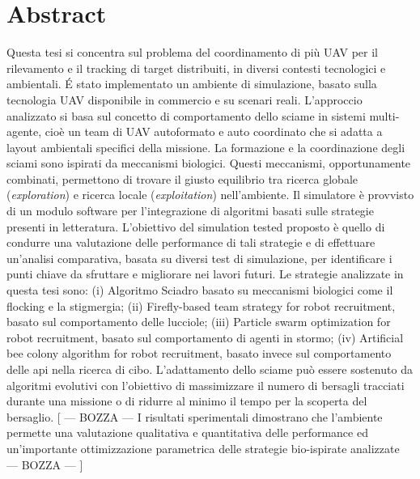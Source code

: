 \chapter*{Abstract}

Questa tesi si concentra sul problema del coordinamento di più UAV per il rilevamento e il tracking di target distribuiti, in diversi contesti tecnologici e ambientali. 
\'E stato implementato un ambiente di simulazione, basato sulla tecnologia UAV disponibile in commercio e su scenari reali. 
L'approccio analizzato si basa sul concetto di comportamento dello sciame in sistemi multi-agente, cioè un team di UAV autoformato e auto coordinato che si adatta a layout ambientali specifici della missione. 
La formazione e la coordinazione degli sciami sono ispirati da meccanismi biologici.
Questi meccanismi, opportunamente combinati, permettono di trovare il giusto equilibrio tra ricerca globale (\textit{exploration}) e ricerca locale (\textit{exploitation}) nell'ambiente. 
Il simulatore è provvisto di un modulo software per l'integrazione di algoritmi basati sulle strategie presenti in letteratura.
L'obiettivo del simulation tested proposto è quello di condurre una valutazione delle performance di tali strategie e di effettuare un'analisi comparativa, basata su diversi test di simulazione, per identificare i punti chiave da sfruttare e migliorare nei lavori futuri. 
Le strategie analizzate in questa tesi sono: (i) Algoritmo Sciadro basato su meccanismi biologici come il flocking e la stigmergia; (ii) Firefly-based team strategy for robot recruitment, basato sul comportamento delle lucciole; (iii) Particle swarm optimization for robot recruitment, basato sul comportamento di agenti in stormo; (iv) Artificial bee colony algorithm for robot recruitment, basato invece sul comportamento delle api nella ricerca di cibo.
L'adattamento dello sciame può essere sostenuto da algoritmi evolutivi con l'obiettivo di massimizzare il numero di bersagli tracciati durante una missione o di ridurre al minimo il tempo per la scoperta del bersaglio. 
[ --- BOZZA --- I risultati sperimentali dimostrano che l'ambiente permette una valutazione qualitativa e quantitativa delle performance ed un'importante ottimizzazione parametrica delle strategie bio-ispirate analizzate --- BOZZA --- ]

\restoregeometry
